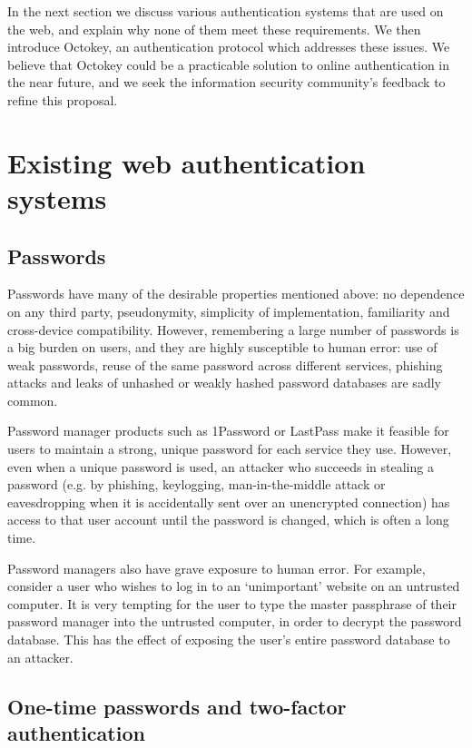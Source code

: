 In the next section we discuss various authentication systems that are used on the web, and explain
why none of them meet these requirements. We then introduce Octokey, an authentication protocol
which addresses these issues. We believe that Octokey could be a practicable solution to online
authentication in the near future, and we seek the information security community's feedback to
refine this proposal.

\section{Existing web authentication systems}
\subsection{Passwords}

Passwords have many of the desirable properties mentioned above: no dependence on any third party,
pseudonymity, simplicity of implementation, familiarity and cross-device compatibility. However,
remembering a large number of passwords is a big burden on users, and they are highly susceptible to
human error: use of weak passwords, reuse of the same password across different services, phishing
attacks and leaks of unhashed or weakly hashed password databases are sadly common.

Password manager products such as 1Password or LastPass make it feasible for users to maintain a
strong, unique password for each service they use. However, even when a unique password is used, an
attacker who succeeds in stealing a password (e.g. by phishing, keylogging, man-in-the-middle attack
or eavesdropping when it is accidentally sent over an unencrypted connection) has access to that
user account until the password is changed, which is often a long time.

Password managers also have grave exposure to human error. For example, consider a user who wishes
to log in to an `unimportant' website on an untrusted computer. It is very tempting for the user to
type the master passphrase of their password manager into the untrusted computer, in order to
decrypt the password database. This has the effect of exposing the user's entire password database
to an attacker.

\subsection{One-time passwords and two-factor authentication}

